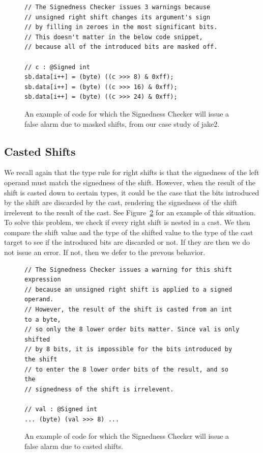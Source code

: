 \begin{figure}
\begin{lstlisting}
// The Signedness Checker issues 3 warnings because
// unsigned right shift changes its argument's sign
// by filling in zeroes in the most significant bits.
// This doesn't matter in the below code snippet,
// because all of the introduced bits are masked off.

// c : @Signed int
sb.data[i++] = (byte) ((c >>> 8) & 0xff);
sb.data[i++] = (byte) ((c >>> 16) & 0xff);
sb.data[i++] = (byte) ((c >>> 24) & 0xff);

\end{lstlisting}
\caption{An example of code for which the Signedness Checker will issue a false
alarm due to masked shifts, from our case study of jake2.}
\label{fig:maskedshift}
\end{figure}

\subsection{Casted Shifts}
We recall again that the type rule for right shifts is that the signedness
of the left
operand must match the signedness of the shift. However, when the result of the
shift is casted down to certain types, it could be the case that the bits
introduced by the shift are discarded by the cast, rendering the signedness of
the shift irrelevent to the result of the cast.
See Figure~\ref{fig:castedshift} for an example of this situation. To solve this
problem, we check if every right shift is nested in a cast. We then compare the
shift value and the type of the shifted value to the type of the cast target
to see if the introduced bits are discarded or not. If they are then we do not
issue an error. If not, then we defer to the prevous behavior.

\begin{figure}
\begin{lstlisting}
// The Signedness Checker issues a warning for this shift expression
// because an unsigned right shift is applied to a signed operand.
// However, the result of the shift is casted from an int to a byte,
// so only the 8 lower order bits matter. Since val is only shifted
// by 8 bits, it is impossible for the bits introduced by the shift
// to enter the 8 lower order bits of the result, and so the
// signedness of the shift is irrelevent.

// val : @Signed int
... (byte) (val >>> 8) ...
\end{lstlisting}
\caption{An example of code for which the Signedness Checker will issue a false
alarm due to casted shifts.}
\label{fig:castedshift}
\end{figure}

